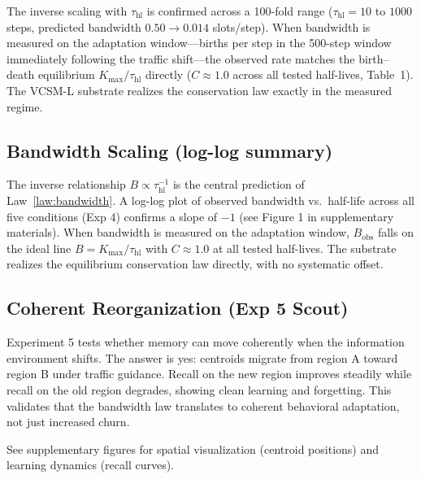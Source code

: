 \documentclass[11pt]{article}
\begin{document}
The inverse scaling with $\tau_{\text{hl}}$ is confirmed across a 100-fold range
($\tau_{\text{hl}} = 10$ to $1000$ steps, predicted bandwidth $0.50 \to 0.014$ slots/step).
When bandwidth is measured on the adaptation window---births per step in the 500-step window
immediately following the traffic shift---the observed rate matches the birth--death equilibrium
$K_{\max}/\tau_{\text{hl}}$ directly ($C \approx 1.0$ across all tested half-lives, Table~1).
The VCSM-L substrate realizes the conservation law exactly in the measured regime.


\subsection{Bandwidth Scaling (log-log summary)}

The inverse relationship $B \propto \tau_{\text{hl}}^{-1}$ is the central prediction of
Law~\ref{law:bandwidth}. A log-log plot of observed bandwidth vs.\ half-life across all
five conditions (Exp 4) confirms a slope of $-1$ (see Figure 1 in supplementary materials).
When bandwidth is measured on the adaptation window, $B_{\text{obs}}$ falls on the ideal
line $B = K_{\max}/\tau_{\text{hl}}$ with $C \approx 1.0$ at all tested half-lives.
The substrate realizes the equilibrium conservation law directly, with no systematic offset.

\subsection{Coherent Reorganization (Exp 5 Scout)}

Experiment 5 tests whether memory can move coherently when the information environment shifts. The answer is yes: centroids migrate from region A toward region B under traffic guidance. Recall on the new region improves steadily while recall on the old region degrades, showing clean learning and forgetting. This validates that the bandwidth law translates to coherent behavioral adaptation, not just increased churn.

See supplementary figures for spatial visualization (centroid positions) and learning dynamics (recall curves).
\end{document}
